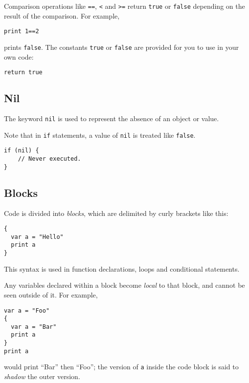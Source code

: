 Comparison operations like \texttt{==}, \texttt{\textless{}} and
\texttt{\textgreater{}=} return \texttt{true} or \texttt{false}
depending on the result of the comparison. For example,

\begin{lstlisting}
print 1==2
\end{lstlisting}

prints \texttt{false}. The constants \texttt{true} or \texttt{false} are
provided for you to use in your own code:

\begin{lstlisting}
return true
\end{lstlisting}

\hypertarget{nil}{%
\subsection{Nil}\label{nil}}

The keyword \texttt{nil} is used to represent the absence of an object
or value.

Note that in \texttt{if} statements, a value of \texttt{nil} is treated
like \texttt{false}.

\begin{lstlisting}
if (nil) {
    // Never executed.
}
\end{lstlisting}

\hypertarget{blocks}{%
\subsection{Blocks}\label{blocks}}

Code is divided into \emph{blocks}, which are delimited by curly
brackets like this:

\begin{lstlisting}
{
  var a = "Hello"
  print a
}
\end{lstlisting}

This syntax is used in function declarations, loops and conditional
statements.

Any variables declared within a block become \emph{local} to that block,
and cannot be seen outside of it. For example,

\begin{lstlisting}
var a = "Foo"
{
  var a = "Bar"
  print a
}
print a
\end{lstlisting}

would print ``Bar'' then ``Foo''; the version of \texttt{a} inside the
code block is said to \emph{shadow} the outer version.

